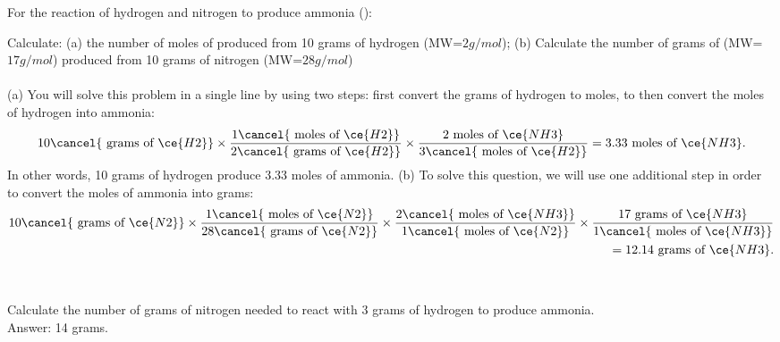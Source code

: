 \documentclass[main.tex]{subfiles}
\begin{document}
\begin{description}
\begin{example} %
For the reaction of hydrogen and nitrogen to produce ammonia ():
\begin{center} \end{center}
Calculate: (a) the number of moles of   produced from 10 grams of hydrogen (MW=$2g/mol$); (b) Calculate the number of grams of  (MW=$17g/mol$) produced from 10 grams of nitrogen (MW=$28g/mol$) \\
\\
(a) You will solve this problem in a single line by using two steps: first convert the grams of hydrogen to moles, to then convert the moles of hydrogen into ammonia:
\begin{equation*}
10\cancel{\text{ grams of }\ce{H2}}   \times  \dfrac{1\cancel{\text{ moles of }\ce{H2}}}{2\cancel{\text{ grams of }\ce{H2}}}
 \times \dfrac{\text{2 moles of }\ce{NH3}}{3\cancel{\text{ moles of }\ce{H2}}}=3.33\text{ moles of }\ce{NH3}.
\end{equation*}
In other words, 10 grams of hydrogen produce 3.33 moles of ammonia. (b) To solve this question, we will use one additional step in order to convert the moles of ammonia into grams:
\begin{equation*}\begin{split}
10\cancel{\text{ grams of }\ce{N2}}   \times  \dfrac{1\cancel{\text{ moles of }\ce{N2}}}{28\cancel{\text{ grams of }\ce{N2}}}
 \times \dfrac{2\cancel{\text{ moles of }\ce{NH3}}}{1\cancel{\text{ moles of }\ce{N2}}}
  \times  \dfrac{17\text{ grams of }\ce{NH3}}{1\cancel{\text{ moles of }\ce{NH3}}}\\
 =12.14\text{ grams of }\ce{NH3}.
\end{split}\end{equation*}
\\
\faDiamond\ \\
Calculate the number of grams of nitrogen needed to react with 3 grams of hydrogen to produce ammonia. \\
\flushright Answer: 14 grams.
\end{example}%

\end{description}

 
\end{document}
